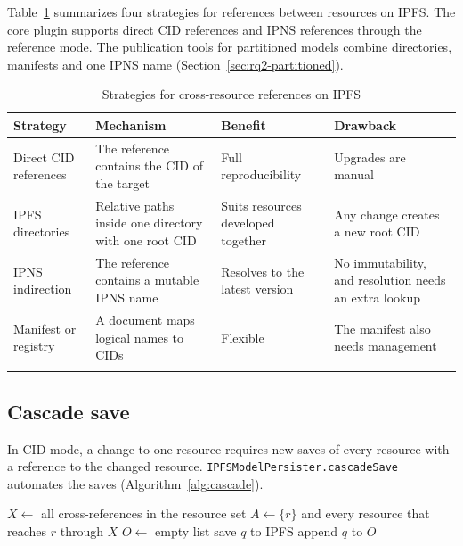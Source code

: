 \documentclass[iicol,pdflatex,sn-mathphys-num]{sn-jnl}
\theoremstyle{thmstylethree}%
\begin{document}
Table~\ref{tab:strategies} summarizes four strategies for references between resources on IPFS. The core plugin supports direct CID references and IPNS references through the reference mode. The publication tools for partitioned models combine directories, manifests and one IPNS name (Section~\ref{sec:rq2-partitioned}).

\begin{table}[t]
\caption{Strategies for cross-resource references on IPFS}\label{tab:strategies}
\begin{tabular}{@{}p{}p{}p{}p{}@{}}
\toprule
Strategy & Mechanism & Benefit & Drawback \\
\midrule
Direct CID references & The reference contains the CID of the target & Full reproducibility & Upgrades are manual \\
IPFS directories & Relative paths inside one directory with one root CID & Suits resources developed together & Any change creates a new root CID \\
IPNS indirection & The reference contains a mutable IPNS name & Resolves to the latest version & No immutability, and resolution needs an extra lookup \\
Manifest or registry & A document maps logical names to CIDs & Flexible & The manifest also needs management \\
\botrule
\end{tabular}
\end{table}

\subsection{Cascade save}\label{sec:rq2-cascade}

In CID mode, a change to one resource requires new saves of every resource with a reference to the changed resource. \texttt{IPFSModelPersister.cascadeSave} automates the saves (Algorithm~\ref{alg:cascade}).

\begin{algorithm}
\caption{Cascade save in CID mode}\label{alg:cascade}
\begin{algorithmic}[1]
\State $X \gets$ all cross-references in the resource set
\State $A \gets \{r\}$ and every resource that reaches $r$ through $X$
\State $O \gets$ empty list
\State {}
\EndFor
{}
\State save $q$ to IPFS
\EndFor
\EndProcedure
\Statex
{}
\State \Return
\EndIf
{}
\State {}
\EndFor
\State append $q$ to $O$
\EndProcedure
\end{algorithmic}
\end{algorithm}
\end{document}
